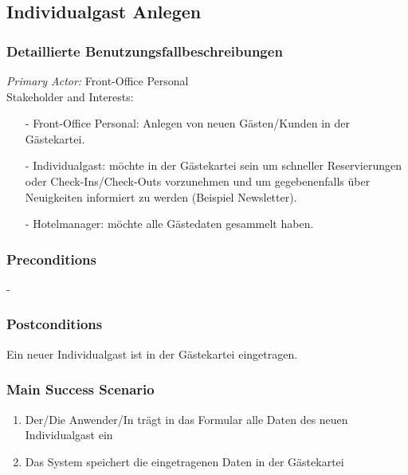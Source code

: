 \documentclass[./detailed_overview_usecases.tex]{subfiles}
\begin{document}
    \subsection{Individualgast Anlegen}
    \subsubsection{Detaillierte Benutzungsfallbeschreibungen}
    \textit{Primary Actor:}
    Front-Office Personal
    \\
    Stakeholder and Interests:
    \begin{itemize}
        \item[-] Front-Office Personal: Anlegen von neuen Gästen/Kunden in der Gästekartei.
        \item[-] Individualgast: möchte in der Gästekartei sein um schneller Reservierungen oder Check-Ins/Check-Outs vorzunehmen
        und um gegebenenfalls über Neuigkeiten informiert zu werden (Beispiel Newsletter).
        \item[-] Hotelmanager: möchte alle Gästedaten gesammelt haben.
    \end{itemize}

    \subsubsection*{Preconditions}
    -

    \subsubsection*{Postconditions}
    Ein neuer Individualgast ist in der Gästekartei eingetragen.

    \subsubsection*{Main Success Scenario}
    \begin{enumerate}
        \item Der/Die Anwender/In trägt in das Formular alle Daten des neuen Individualgast ein
        \item Das System speichert die eingetragenen Daten in der Gästekartei
    \end{enumerate}
\end{document}
